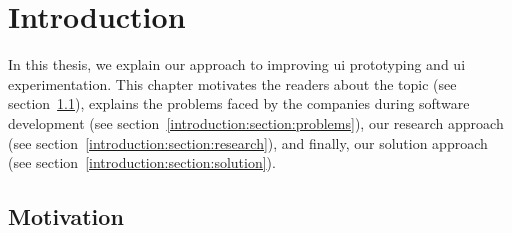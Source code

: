 
\chapter{Introduction}
\label{chap:introduction}
\ifpdf
    \graphicspath{{Chapters/Introduction/Figs/}{Chapters/Introduction/Figs/}{Chapters/Introduction/Figs/}}
\else
    \graphicspath{{Chapters/Introduction/Figs/}{Chapters/Introduction/Figs/}}
\fi
In this thesis, we explain our approach to improving \ac{ui} prototyping and \ac{ui} experimentation.
This chapter motivates the readers about the topic (see section~\ref{introduction:section:motivation}), explains the problems faced by the companies during software development (see section~\ref{introduction:section:problems}), our research approach (see section~\ref{introduction:section:research}), and finally, our solution approach (see section~\ref{introduction:section:solution}).

\section{Motivation} %
\label{introduction:section:motivation}

